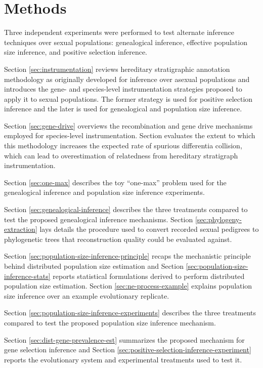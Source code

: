 \section{Methods} \label{sec:methods}

Three independent experiments were performed to test alternate inference techniques over sexual populations: genealogical inference, effective population size inference, and positive selection inference.

Section \ref{sec:instrumentation} reviews hereditary stratigraphic annotation methodology as originally developed for inference over asexual populations and introduces the gene- and species-level instrumentation strategies proposed to apply it to sexual populations.
The former strategy is used for positive selection inference and the later is used for genealogical and population size inference.

Section \ref{sec:gene-drive} overviews the recombination and gene drive mechanisms employed for species-level instrumentation.
Section \label{sec:collision-probability} evaluates the extent to which this methodology increases the expected rate of spurious differentia collision, which can lead to overestimation of relatedness from hereditary stratigraph instrumentation.

Section \ref{sec:one-max} describes the toy ``one-max'' problem used for the genealogical inference and population size inference experiments.

Section \ref{sec:genealogical-inference} describes the three treatments compared to test the proposed genealogical inference mechanisms.
Section \ref{sec:phylogeny-extraction} lays details the procedure used to convert recorded sexual pedigrees to phylogenetic trees that reconstruction quality could be evaluated against.

Section \ref{sec:population-size-inference-principle} recaps the mechanistic principle behind distributed population size estimation and Section \ref{sec:population-size-inference-stats} reports statistical formulations derived to perform distributed population size estimation.
Section \ref{sec:ne-process-example} explains population size inference over an example evolutionary replicate.

Section \ref{sec:population-size-inference-experiments} describes the three treatments compared to test the proposed population size inference mechanism.

Section \ref{sec:dist-gene-prevalence-est} summarizes the proposed mechanism for gene selection inference and Section \ref{sec:positive-selection-inference-experiment} reports the evolutionary system and experimental treatments used to test it.


